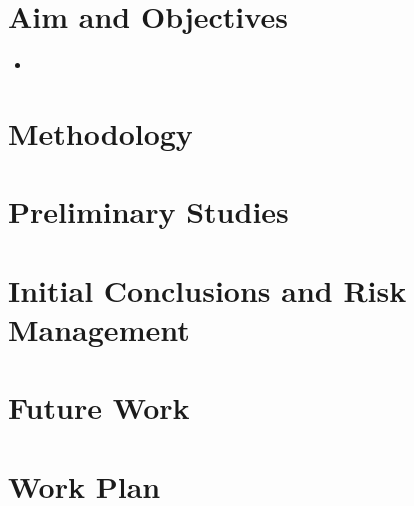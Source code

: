 \documentclass{article}
\begin{document}
\section{Aim and Objectives}
\begin{itemize}
    \item 
\end{itemize}

\section{Methodology}

\section{Preliminary Studies}

\section{Initial Conclusions and Risk Management}

\section{Future Work}

\section{Work Plan}
\end{document}
